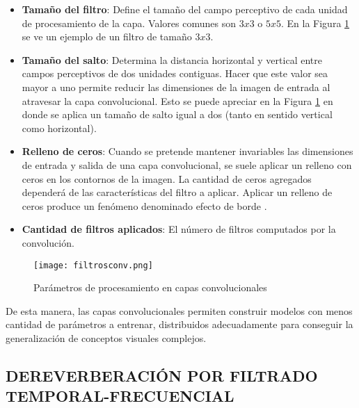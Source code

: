 \begin{itemize}
\item\textbf{Tamaño del filtro}: Define el tamaño del campo perceptivo de cada unidad de procesamiento de la capa. Valores comunes son $3x3$ o $5x5$. En la Figura \ref{fig:variables_conv} se ve un ejemplo de un filtro de tamaño $3x3$.

\item\textbf{Tamaño del salto}: Determina la distancia horizontal y vertical entre campos perceptivos de dos unidades contiguas. Hacer que este valor sea mayor a uno permite reducir las dimensiones de la imagen de entrada al atravesar la capa convolucional. Esto se puede apreciar en la Figura \ref{fig:variables_conv} en donde se aplica un tamaño de salto igual a dos (tanto en sentido vertical como horizontal). 

\item\textbf{Relleno de ceros}: Cuando se pretende mantener invariables las dimensiones de entrada y salida de una capa convolucional, se suele aplicar un relleno con ceros en los contornos de la imagen. La cantidad de ceros agregados dependerá de las características del filtro a aplicar. Aplicar un relleno de ceros produce un fenómeno denominado efecto de borde \cite{lagartija}. 

\item\textbf{Cantidad de filtros aplicados}: El número de filtros computados por la convolución. 

\end{itemize}

\begin{figure}[H]
  \centering{}
  \texttt{[image: filtrosconv.png]}
  \caption{Parámetros de procesamiento en capas convolucionales}
  \label{fig:variables_conv}
\end{figure}

De esta manera, las capas convolucionales permiten construir modelos con menos cantidad de parámetros a entrenar, distribuidos adecuadamente para conseguir la generalización de conceptos visuales complejos. 



\subsection[Dereverberación por filtrado temporal-frecuencial]{DEREVERBERACIÓN POR FILTRADO TEMPORAL-FRECUENCIAL}

